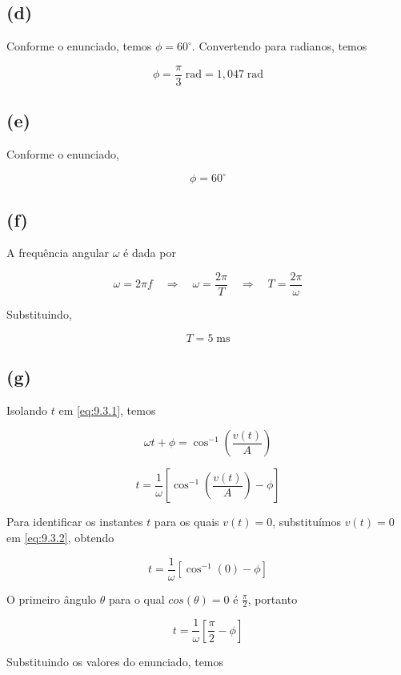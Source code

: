 \subsection*{(d)}

Conforme o enunciado, temos $\phi = 60^{\circ}$. Convertendo para radianos, temos

\[ \boxed{\phi = \frac{\pi}{3} \; \textrm{rad} = 1,047 \; \textrm{rad}}  \]

\subsection*{(e)}

Conforme o enunciado,

\[ \boxed{\phi = 60^{\circ}}  \]

\subsection*{(f)}

A frequência angular $\omega$ é dada por

\[ \omega = 2\pi f \quad \Rightarrow \quad \omega = \frac{2\pi}{T} \quad \Rightarrow \quad T = \frac{2\pi}{\omega}\]

Substituindo,

\[ \boxed{T = 5 \;\textrm{ms}}  \]

\subsection*{(g)}

Isolando $t$ em \eqref{eq:9.3.1}, temos

\[ \omega t + \phi = \cos^{-1}\left(\frac{v(t)}{A}\right) \]

\begin{equation}\label{eq:9.3.2}
    t = \frac{1}{\omega} \left[\cos^{-1}\left(\frac{v(t)}{A}\right) - \phi \right]
\end{equation}

Para identificar os instantes $t$ para os quais $v(t)=0$, substituímos $v(t)=0$ em \eqref{eq:9.3.2}, obtendo

\[  t = \frac{1}{\omega} \left[\cos^{-1}\left(0\right) - \phi \right] \]

O primeiro ângulo $\theta$ para o qual $cos(\theta) = 0$ é $\frac{\pi}{2}$, portanto  

\[  t = \frac{1}{\omega} \left[\frac{\pi}{2} - \phi \right] \]

Substituindo os valores do enunciado, temos

